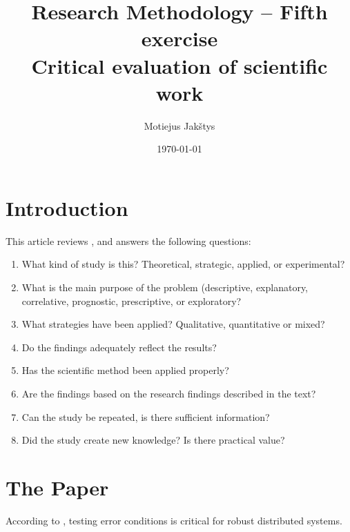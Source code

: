 \documentclass{article}
\title{
    Research Methodology -- Fifth exercise\\ \vspace{4mm}
    Critical evaluation of scientific work
}
\author{Motiejus Jakštys}
\date{\today}
\begin{document}
\maketitle

\section{Introduction}

This article reviews \cite{186171}, and answers the following questions:

\begin{enumerate}
    \item What kind of study is this? Theoretical, strategic, applied, or experimental?
    \item What is the main purpose of the problem (descriptive, explanatory, correlative, prognostic, prescriptive, or exploratory?
    \item What strategies have been applied? Qualitative, quantitative or mixed?

    \item Do the findings adequately reflect the results?
    \item Has the scientific method been applied properly?
    \item Are the findings based on the research findings described in the text?
    \item Can the study be repeated, is there sufficient information?
    \item Did the study create new knowledge? Is there practical value?
\end{enumerate}

\section{The Paper}

According to \cite{186171}, testing error conditions is critical for robust
distributed systems.

\printbibliography
\end{document}
